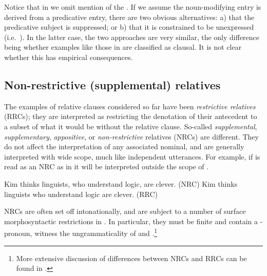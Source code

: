 \documentclass[output=paper
                ,modfonts
                ,nonflat
	        ,collection
	        ,collectionchapter
	        ,collectiontoclongg
 	        ,biblatex
                ,babelshorthands
                ,newtxmath
                ,draftmode
                ,colorlinks, citecolor=brown
]{./langsci/langscibook}
\begin{document}
Notice that in  we omit mention of the . If we assume the
noun-modifying entry is derived from a predicative entry, there are two obvious
alternatives: a) that the predicative subject is suppressed; or b) that it is constrained
to be unexpressed (i.e.\ ). In the latter case, the two approaches are very
similar, the only difference being whether examples like those in  are
classified as clausal. It is not clear whether this has empirical consequences.

\subsection{Non-restrictive (supplemental) relatives}
\label{sec:rc-non-restr-suppl}

The examples of relative clauses considered so far have been \emph{restrictive relatives} (RRCs); they are
interpreted as restricting the denotation of their antecedent to a subset of what
it would be without the relative clause. So-called \emph{supplemental}, \emph{supplementary}, \emph{appositive}, or \emph{non-restrictive}
relatives (NRCs) are different. They do not affect the interpretation of any associated
nominal, and are generally interpreted with wide scope, much like independent
utterances. For example, if  is read as an NRC as in 
it will be interpreted outside the scope of .
\begin{exe}\ex\begin{xlist}\label{x:rc-106}
  \ex\label{x:rc-107} Kim thinks linguists, who understand logic, are clever. \hfill (NRC)
  \ex\label{x:rc-108} Kim thinks linguists who understand logic are clever. \hfill (RRC)
\end{xlist}\end{exe}
NRCs are often set off intonationally, and are subject to a number of surface
morphosyntactic restrictions in .  In particular, they must be finite and contain a
-pronoun, witness the ungrammaticality of  and
.\footnote{More extensive discussion of differences between NRCs and RRCs can
  be found in \cite{Arnold07}.}
\begin{exe}\ex\begin{xlist}
\end{xlist}\end{exe}
\end{document}
